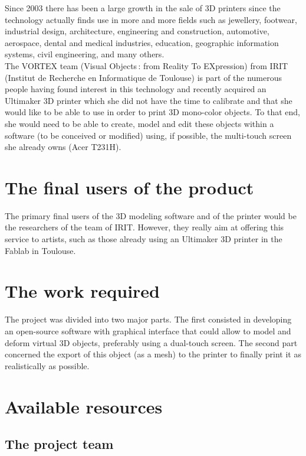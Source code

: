 \documentclass{report}
\begin{document}
	Since 2003 there has been a large growth in the sale of 3D printers since the technology actually finds use in more and more fields such as jewellery, footwear, industrial design, architecture, engineering and construction, automotive, aerospace, dental and medical industries, education, geographic information systems, civil engineering, and many others.\\

	The VORTEX team (Visual Objects : from Reality To EXpression) from IRIT (Institut de Recherche en Informatique de Toulouse) is part of the numerous people having found interest in this technology and recently acquired an Ultimaker 3D printer which she did not have the time to calibrate and that she would like to be able to use in order to print 3D mono-color objects. To that end, she would need to be able to create, model and edit these objects within a software (to be conceived or modified) using, if possible, the multi-touch screen she already owns (Acer T231H).\\

\section{The final users of the product}

	The primary final users of the 3D modeling software and of the printer would be the researchers of the team of IRIT. However, they really aim at offering this service to artists, such as those already using an Ultimaker 3D printer in the Fablab in Toulouse.

\section{The work required}

	The project was divided into two major parts. The first consisted in developing an open-source software with graphical interface that could allow to model and deform virtual 3D objects, preferably using a dual-touch screen. The second part concerned the export of this object (as a mesh) to the printer to finally print it as realistically as possible.

\section{Available resources}

\subsection{The project team}
\end{document}
